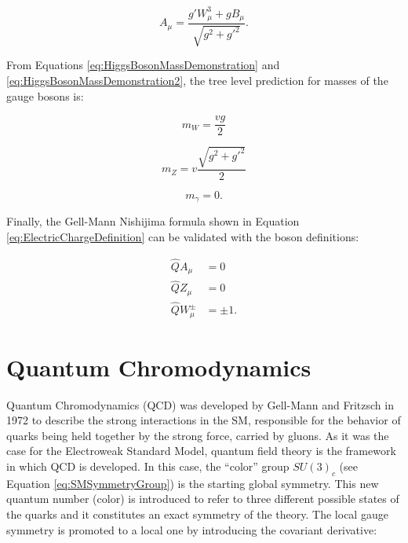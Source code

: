 \begin{equation}
A_\mu = \frac{g'W_\mu^3 + gB_\mu}{\sqrt{g^2 + g'^2}}.
\label{eq:HiggsAdefinition}
\end{equation}

From Equations \ref{eq:HiggsBosonMassDemonstration} and \ref{eq:HiggsBosonMassDemonstration2}, the tree level prediction for masses of the gauge bosons is:

\begin{equation}
m_W = \frac{vg}{2}
\label{eq:HiggsWmass}
\end{equation}

\begin{equation}
m_Z = v \frac{\sqrt{g^2 + g'^2}}{2}
\label{eq:HiggsZmass}
\end{equation}

\begin{equation}
m_\gamma = 0.
\label{eq:HiggsAmass}
\end{equation}

Finally, the Gell-Mann Nishijima formula shown in Equation \ref{eq:ElectricChargeDefinition} can be validated with the boson definitions:

\begin{equation}
\begin{split}
\hat{Q}A_\mu &= 0 \\
\hat{Q}Z_\mu &= 0 \\
\hat{Q}W^{\pm}_\mu &= \pm 1.
\end{split}
\label{eq:ValidationElectricChargeDefinition}
\end{equation}


\section{Quantum Chromodynamics}
    \label{sec:QCD}

Quantum Chromodynamics (QCD) was developed by Gell-Mann and Fritzsch in 1972 to describe the strong interactions in the SM, responsible for the behavior of quarks being held together by the strong force, carried by gluons.
As it was the case for the Electroweak Standard Model, quantum field theory is the framework in which QCD is developed.
In this case, the ``color'' group $SU(3)_c$ (see Equation \ref{eq:SMSymmetryGroup}) is the starting global symmetry.
This new quantum number (color) is introduced to refer to three different possible states of the quarks and it constitutes an exact symmetry of the theory.
The local gauge symmetry is promoted to a local one by introducing the covariant derivative:

